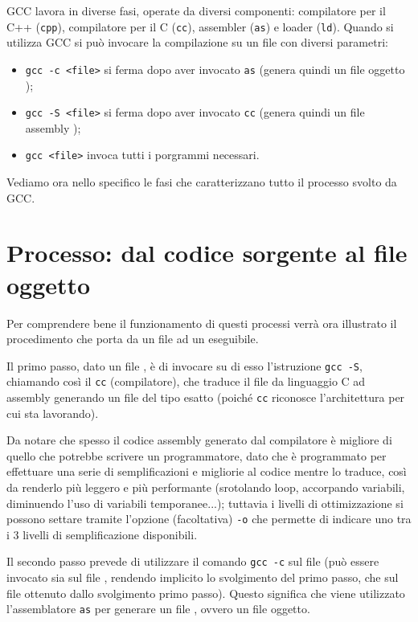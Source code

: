 \documentclass[class=book, crop=false, oneside]{standalone}
\begin{document}
GCC lavora in diverse fasi, operate da diversi componenti: compilatore per il C++ (\texttt{cpp}), compilatore per il C (\texttt{cc}), assembler (\texttt{as}) e loader (\texttt{ld}).
Quando si utilizza GCC si può invocare la compilazione su un file con diversi parametri:
\begin{itemize}
	\item \texttt{gcc -c <file>} si ferma dopo aver invocato \texttt{as} (genera quindi un file oggetto );
	\item \texttt{gcc -S <file>} si ferma dopo aver invocato \texttt{cc} (genera quindi un file assembly );
	\item \texttt{gcc <file>} invoca tutti i porgrammi necessari.
\end{itemize}
Vediamo ora nello specifico le fasi che caratterizzano tutto il processo svolto da GCC.

\section{Processo: dal codice sorgente al file oggetto}
Per comprendere bene il funzionamento di questi processi verrà ora illustrato il procedimento che porta da un file  ad un eseguibile.

Il primo passo, dato un file , è di invocare su di esso l'istruzione \texttt{gcc -S}, chiamando così il \texttt{cc} (compilatore), che traduce il file da linguaggio C ad assembly generando un file  del tipo esatto (poiché \texttt{cc} riconosce l'architettura per cui sta lavorando).

Da notare che spesso il codice assembly generato dal compilatore è migliore di quello che potrebbe scrivere un programmatore, dato che è programmato per effettuare una serie di semplificazioni e migliorie al codice mentre lo traduce, così da renderlo più leggero e più performante (srotolando loop, accorpando variabili, diminuendo l'uso di variabili temporanee...); tuttavia i livelli di ottimizzazione si possono settare tramite l'opzione (facoltativa) \texttt{-o} che permette di indicare uno tra i \(3\) livelli di semplificazione disponibili.

Il secondo passo prevede di utilizzare il comando \texttt{gcc -c} sul file (può essere invocato sia sul file , rendendo implicito lo svolgimento del primo passo, che sul file  ottenuto dallo svolgimento primo passo). Questo significa che viene utilizzato l'assemblatore \texttt{as} per generare un file , ovvero un file oggetto.
\end{document}
